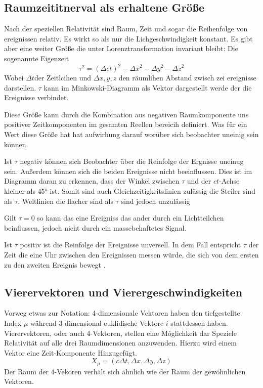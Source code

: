 \documentclass[12pt]{article}
\begin{document}
\subsection{Raumzeititnerval als erhaltene Größe}%
Nach der speziellen Relativität sind Raum, Zeit und sogar die Reihenfolge von ereignissen relativ.
Es wirkt so als nur die Lichgeschwindigkeit konstant.
Es gibt aber eine weiter Größe die unter Lorenztransformation invariant bleibt:
Die sogenannte Eigenzeit%
\begin{equation}
\tau^2 = (\Delta ct)^2 - {\Delta x}^2 - {\Delta y}^2 - {\Delta z}^2
\end{equation}
Wobei $\Delta t$der Zeitlcihen und $\Delta x, y, z$ den räumlihen Abstand zwisch zei ereignisse darstellen.
$\tau$ kann im Minkowski-Diagramm als Vektor dargestellt werde der die Ereignisse verbindet.

Diese Größe kann durch die Kombination aus negativen Raumkomponente uns positiver Zeitkomponenten im gesamten Reellen bereicih definiert.
Was für ein Wert diese Größe hat hat aufwirhung darauf worüber sich beobachter uneinig sein können.

Ist $\tau$ negativ können sich Beobachter über die Reinfolge der Ergnisse uneinug sein.
Außerdem können sich die beiden Ereignisse nicht beeinflussen.
Dies ist im Diagramm daran zu erkennen, dass der Winkel zwischen $\tau$ und der $ct$-Achse kleiner als \ang{45} ist.
Somit sind auch Gleichzeitigkeitslinien zulässig die Steiler sind als $\tau$.
Weltlinien die flacher sind als $\tau$ sind jedoch unzulässig

Gilt $\tau = 0$ so kann das eine Ereigniss das ander durch ein Lichtteilchen beinflussen, jedoch nicht durch ein massebehaftetes Signal.

Ist $\tau$ positiv ist die Reinfolge der Ereignisse unversell.
In dem Fall entspricht $\tau$ der Zeit die eine Uhr zwischen den Ereignissen messen würde, die sich von dem ersten zu den zweiten Ereignis bewegt
.%
\subsection{Vierervektoren und Vierergeschwindigkeiten}
\label{4v}
Vorweg etwas zur Notation: 4-dimensionale Vektoren haben den tiefgestellte Index $\mu$ während 3-dimensional euklidische Vektore $i$ stattdessen haben.
Vierervektoren, oder auch 4-Vektoren, stellen eine Móglichkeit dar Speziele Relativität auf alle drei Raumdimensionen anzuwenden.
Hierzu wird einem Vektor eine Zeit-Komponente Hinzugefügt.
\begin{equation}
X_\mu = (c\Delta t, \Delta x, \Delta y, \Delta z)
\end{equation}
Der Raum der 4-Vekoren verhält sich ähnlich wie der Raum der gewöhnlichen Vektoren.
\end{document}
